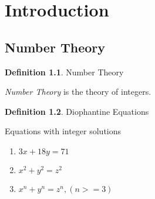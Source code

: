 \documentclass[fleqn,letterpaper,10pt,twoside]{report}
\newcounter{example}
\theoremstyle{plain}
\theoremstyle{definition}
\newtheorem{definition}{Definition}[section]
\theoremstyle{remark}
\begin{document}
\pagestyle{fancy}

\renewcommand{\chaptermark}[1]{\markboth{\chaptername \ \thechapter.\ #1}{}}
\renewcommand{\sectionmark}[1]{\markright{\thesection.\ #1}{}}
\fancyhead[LE,RO]{\sffamily\bfseries \rightmark}
\fancyhead[LO,RE]{\sffamily\bfseries \leftmark}

\setcounter{chapter}{0}
\setcounter{definition}{1}
\setcounter{example}{1}

\chapter{Introduction}
\section{Number Theory}
\begin{definition}{Number Theory}

   \textit{Number Theory} is the theory of integers.
\end{definition}

\begin{definition}{Diophantine Equations }

   Equations with integer solutions
   \begin{enumerate}
      \item{\(3x + 18y = 71\)}
      \item{\(x^2 + y^2 = z^2\)}
      \item{\(x^n + y^n = z^n, (n >= 3)\)}
   \end{enumerate}
\end{definition}
\end{document}
